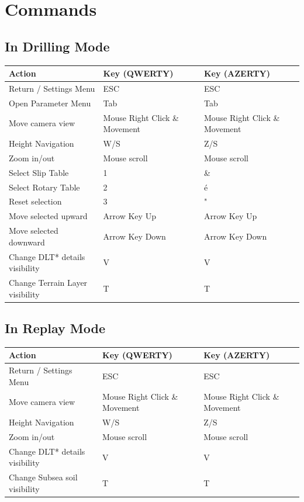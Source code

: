\documentclass{article}
\begin{document}
\newpage
\section{Commands}
\subsection{In Drilling Mode}
\begin{table}[h]
    \begin{tabular}{|l|l|l|}
        \hline
        \textbf{Action} & \textbf{Key (QWERTY)} & \textbf{Key (AZERTY)}\\
        \hline
        Return / Settings Menu & ESC & ESC\\
        \hline
        Open Parameter Menu & Tab & Tab\\
        \hline
        Move camera view & Mouse Right Click \& Movement & Mouse Right Click \& Movement\\
        \hline
        Height Navigation & W/S & Z/S\\
        \hline
        Zoom in/out & Mouse scroll & Mouse scroll\\
        \hline
        Select Slip Table & 1 & \&\\
        \hline
        Select Rotary Table	& 2 & é\\
        \hline
        Reset selection & 3 & "\\
        \hline
        Move selected upward & Arrow Key Up & Arrow Key Up\\
        \hline
        Move selected downward & Arrow Key Down & Arrow Key Down\\
        \hline
        Change DLT* details visibility	& V & V\\
        \hline
        Change Terrain Layer visibility & T & T\\
        \hline
    \end{tabular}
\end{table}

\subsection{In Replay Mode}
\begin{table}[h]
    \begin{tabular}{|l|l|l|}
        \hline
        \textbf{Action} & \textbf{Key (QWERTY)} & \textbf{Key (AZERTY)}\\
        \hline
        Return / Settings Menu & ESC & ESC\\
        \hline
        Move camera view & Mouse Right Click \& Movement & Mouse Right Click \& Movement\\
        \hline
        Height Navigation & W/S & Z/S\\
        \hline
        Zoom in/out & Mouse scroll & Mouse scroll\\
        \hline
        Change DLT* details visibility	& V & V\\
        \hline
        Change Subsea soil visibility & T & T\\
        \hline
    \end{tabular}
\end{table}
\end{document}
